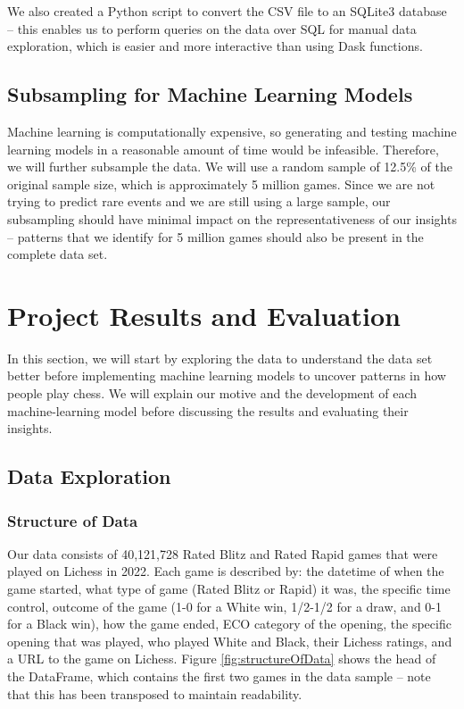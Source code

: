 \documentclass[a4paper, 11pt]{article}
\begin{document}
We also created a Python script to convert the CSV file to an SQLite3 database -- this enables us to perform queries on the data over SQL for manual data exploration, which is easier and more interactive than using Dask functions.

\subsection{Subsampling for Machine Learning Models}
Machine learning is computationally expensive, so generating and testing machine learning models in a reasonable amount of time would be infeasible. Therefore, we will further subsample the data. We will use a random sample of 12.5\% of the original sample size, which is approximately 5 million games. Since we are not trying to predict rare events and we are still using a large sample, our subsampling should have minimal impact on the representativeness of our insights -- patterns that we identify for 5 million games should also be present in the complete data set.

\section{Project Results and Evaluation}
In this section, we will start by exploring the data to understand the data set better before implementing machine learning models to uncover patterns in how people play chess. We will explain our motive and the development of each machine-learning model before discussing the results and evaluating their insights.

\subsection{Data Exploration}

\subsubsection{Structure of Data}
Our data consists of 40,121,728 Rated Blitz and Rated Rapid games that were played on Lichess in 2022. Each game is described by: the datetime of when the game started, what type of game (Rated Blitz or Rapid) it was, the specific time control, outcome of the game (1-0 for a White win, 1/2-1/2 for a draw, and 0-1 for a Black win), how the game ended, ECO category of the opening, the specific opening that was played, who played White and Black, their Lichess ratings, and a URL to the game on Lichess. Figure \ref{fig:structureOfData} shows the head of the DataFrame, which contains the first two games in the data sample -- note that this has been transposed to maintain readability.
\end{document}
